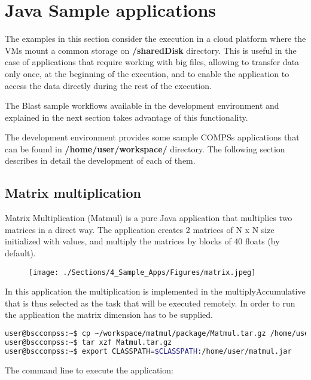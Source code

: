 \section{Java Sample applications}
\label{sec:JavaSampleApps}

The examples in this section consider the execution in a cloud platform where the VMs mount a common 
storage on {\bf /sharedDisk} directory. This is useful in the case of applications that require working 
with big files, allowing to transfer data only once, at the beginning of the execution, and to enable 
the application to access the data directly during the rest of the execution.

The Blast sample workflows available in the development environment and explained in the next section 
takes advantage of this functionality.

The development environment provides some sample COMPSs applications that can be found in 
{\bf /home/user/workspace/} directory. The following section describes in detail the development 
of each of them.

\subsection{Matrix multiplication}
Matrix Multiplication (Matmul) is a pure Java application that multiplies two matrices in a direct way. 
The application creates 2 matrices of N x N size initialized with values, and multiply the matrices by 
blocks of 40 floats (by default).

\begin{figure}[ht!]
  \centering
    \texttt{[image: ./Sections/4\_Sample\_Apps/Figures/matrix.jpeg]}
\end{figure}

In this application the multiplication is implemented in the multiplyAccumulative that is thus selected 
as the task that will be executed remotely. In order to run the application the matrix dimension has to 
be supplied.

\begin{lstlisting}[language=bash]
user@bsccompss:~$ cp ~/workspace/matmul/package/Matmul.tar.gz /home/user/
user@bsccompss:~$ tar xzf Matmul.tar.gz
user@bsccompss:~$ export CLASSPATH=$CLASSPATH:/home/user/matmul.jar
\end{lstlisting}

The command line to execute the application:

